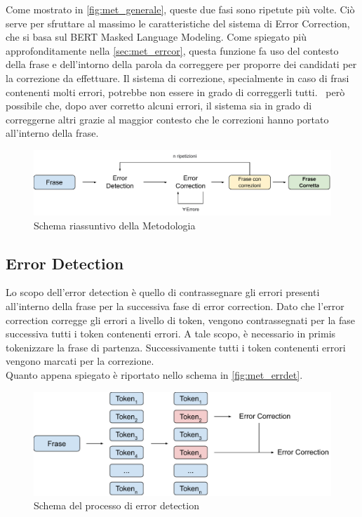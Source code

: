 Come mostrato in \autoref{fig:met_generale}, queste due fasi sono ripetute più volte. Ciò serve per sfruttare al massimo le caratteristiche del sistema di Error Correction, che si basa sul BERT Masked Language Modeling. Come spiegato più approfonditamente nella \autoref{sec:met_errcor}, questa funzione fa uso del contesto della frase e dell'intorno della parola da correggere per proporre dei candidati per la correzione da effettuare.
Il sistema di correzione, specialmente in caso di frasi contenenti molti errori, potrebbe non essere in grado di correggerli tutti. \E\ però possibile che, dopo aver corretto alcuni errori, il sistema sia in grado di correggerne altri grazie al maggior contesto che le correzioni hanno portato all'interno della frase.


\begin{figure}[H]
\centering
\includegraphics[width=\textwidth]{immagini/metodologia/generale}
\caption{Schema riassuntivo della Metodologia}
\label{fig:met_generale}
\end{figure}


\subsection{Error Detection}
\label{sec:met_errdet}

Lo scopo dell'error detection è quello di contrassegnare gli errori presenti all'interno della frase per la successiva fase di error correction. Dato che l'error correction corregge gli errori a livello di token, vengono contrassegnati per la fase successiva tutti i token contenenti errori. A tale scopo, è necessario in primis tokenizzare la frase di partenza. Successivamente tutti i token contenenti errori vengono marcati per la correzione.\\
Quanto appena spiegato è riportato nello schema in \autoref{fig:met_errdet}.

\begin{figure}[H]
\centering
\includegraphics[width=\textwidth]{immagini/metodologia/error_detection}
\caption{Schema del processo di error detection}
\label{fig:met_errdet}
\end{figure}

